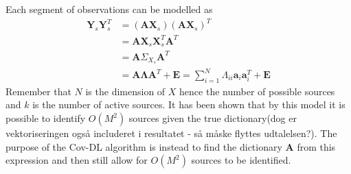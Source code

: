 Each segment of observations can be modelled as
\begin{align}
\textbf{Y}_s\textbf{Y}_s^{T} &=(\textbf{A}\textbf{X}_s)(\textbf{A}\textbf{X}_s)^{T}\nonumber \\
&=\textbf{AX}_s\textbf{X}_s^T\textbf{A}^T \nonumber \\
&=\textbf{A}\Sigma_{{X}_s}\textbf{A}^T \nonumber\\
&=\mathbf{A} \boldsymbol{\Lambda} \mathbf{A}^T + \mathbf{E} = \sum_{i=1}^{N}\Lambda_{ii}\textbf{a}_i\textbf{a}_i^{T}+\textbf{E}\label{eq:cov_model}
 \end{align}
Remember that $N$ is the dimension of $X$ hence the number of possible sources and $k$ is the number of active sources.
It has been shown that by this model it is possible to identify $O(M^2)$ sources given the true dictionary\cite{Pal2015}(dog er vektoriseringen også includeret i resultatet - så måske flyttes udtalelsen?). The purpose of the Cov-DL algorithm is instead to find the dictionary $\textbf{A}$ from this expression and then still allow for $O(M^2)$ sources to be identified.


